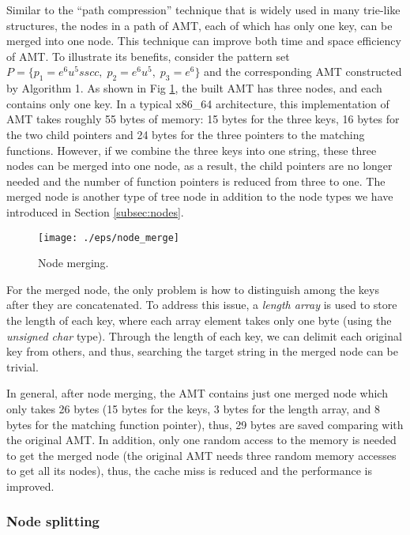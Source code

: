 \documentclass{article}
\begin{document}
Similar to the ``path compression'' technique that is widely used in
many trie-like structures, the nodes in a path of AMT, each of which
has only one key, can be merged into one node. This technique can
improve both time and space efficiency of AMT. To illustrate its
benefits, consider the pattern set
$P=\{p_1=e^6u^5sscc,\; p_2=e^6u^5,\; p_3=e^6\}$ and the corresponding
AMT constructed by Algorithm 1. As shown in Fig \ref{fig:merge}, the
built AMT has three nodes, and each contains only one key. In a
typical x86\_64 architecture, this implementation of AMT takes roughly
55 bytes of memory: 15 bytes for the three keys, 16 bytes for the two
child pointers and 24 bytes for the three pointers to the matching
functions. However, if we combine the three keys into one string,
these three nodes can be merged into one node, as a result, the child
pointers are no longer needed and the number of function pointers is
reduced from three to one. The merged node is another type of tree
node in addition to the node types we have introduced in Section
\ref{subsec:nodes}.

\begin{figure}[htbp]
  \centering
  \texttt{[image: ./eps/node\_merge]}
  \caption{Node merging.}
  \label{fig:merge}
\end{figure}

For the merged node, the only problem is how to distinguish among the
keys after they are concatenated. To address this issue, a
\emph{length array} is used to store the length of each key, where
each array element takes only one byte (using the \emph{unsigned char}
type). Through the length of each key, we can delimit each original
key from others, and thus, searching the target string in the merged
node can be trivial.

In general, after node merging, the AMT contains just one merged node
which only takes 26 bytes (15 bytes for the keys, 3 bytes for the
length array, and 8 bytes for the matching function pointer), thus, 29
bytes are saved comparing with the original AMT. In addition, only one
random access to the memory is needed to get the merged node (the
original AMT needs three random memory accesses to get all its nodes),
thus, the cache miss is reduced and the performance is improved.


\subsubsection{Node splitting}
\label{sec:node split}
\end{document}
